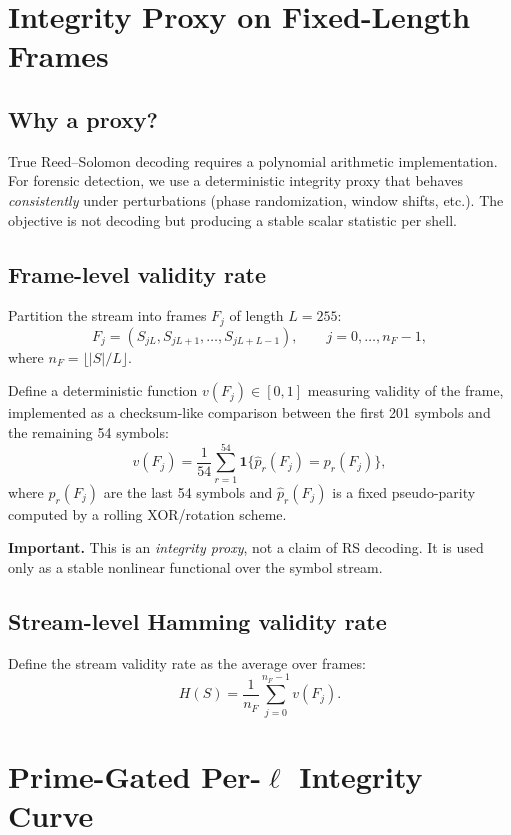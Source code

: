 \documentclass[11pt,a4paper]{article}
\begin{document}
\section{Integrity Proxy on Fixed-Length Frames}

\subsection{Why a proxy?}
True Reed--Solomon decoding requires a polynomial arithmetic implementation.
For forensic detection, we use a deterministic integrity proxy that behaves
\emph{consistently} under perturbations (phase randomization, window shifts, etc.).
The objective is not decoding but producing a stable scalar statistic per shell.

\subsection{Frame-level validity rate}
Partition the stream into frames $F_j$ of length $L=255$:
\begin{equation}
F_j = (S_{jL}, S_{jL+1}, \dots, S_{jL+L-1}),\qquad j=0,\dots,n_F-1,
\end{equation}
where $n_F=\lfloor |S|/L\rfloor$.

Define a deterministic function $v(F_j)\in[0,1]$ measuring validity of the frame,
implemented as a checksum-like comparison between the first 201 symbols and the
remaining 54 symbols:
\begin{equation}
v(F_j)=\frac{1}{54}\sum_{r=1}^{54}\mathbf{1}\{\widehat{p}_r(F_j)=p_r(F_j)\},
\end{equation}
where $p_r(F_j)$ are the last 54 symbols and $\widehat{p}_r(F_j)$ is a fixed
pseudo-parity computed by a rolling XOR/rotation scheme.

\textbf{Important.} This is an \emph{integrity proxy}, not a claim of RS decoding.
It is used only as a stable nonlinear functional over the symbol stream.

\subsection{Stream-level Hamming validity rate}
Define the stream validity rate as the average over frames:
\begin{equation}
H(S)=\frac{1}{n_F}\sum_{j=0}^{n_F-1} v(F_j).
\end{equation}

\section{Prime-Gated Per-$\ell$ Integrity Curve}
\end{document}
